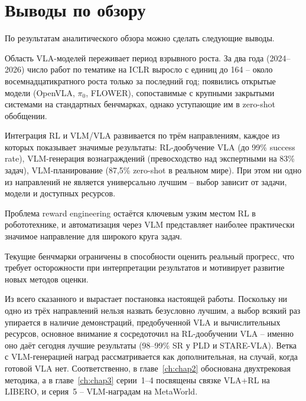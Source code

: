 \section{Выводы по обзору}
\label{sec:review-summary}

    По результатам аналитического обзора можно сделать следующие выводы.

    Область VLA-моделей переживает период взрывного роста. За два года (2024--2026) число работ по тематике на ICLR выросло с единиц до 164 -- около восемнадцатикратного роста только за последний год; появились открытые модели (OpenVLA, $\pi_0$, FLOWER), сопоставимые с крупными закрытыми системами на стандартных бенчмарках, однако уступающие им в zero-shot обобщении.

    Интеграция RL и VLM/VLA развивается по трём направлениям, каждое из которых показывает значимые результаты: RL-дообучение VLA (до 99\% success rate), VLM-генерация вознаграждений (превосходство над экспертными на 83\% задач), VLM-планирование (87,5\% zero-shot в реальном мире). При этом ни одно из направлений не является универсально лучшим -- выбор зависит от задачи, модели и доступных ресурсов.

    Проблема reward engineering остаётся ключевым узким местом RL в робототехнике, и автоматизация через VLM представляет наиболее практически значимое направление для широкого круга задач.

    Текущие бенчмарки ограничены в способности оценить реальный прогресс, что требует осторожности при интерпретации результатов и мотивирует развитие новых методов оценки.

    Из всего сказанного и вырастает постановка настоящей работы. Поскольку ни одно из трёх направлений нельзя назвать безусловно лучшим, а выбор всякий раз упирается в наличие демонстраций, предобученной VLA и вычислительных ресурсов, основное внимание я сосредоточил на RL-дообучении VLA -- именно оно даёт сегодня лучшие результаты (98--99\% SR у PLD и STARE-VLA). Ветка с VLM-генерацией наград рассматривается как дополнительная, на случай, когда готовой VLA нет. Соответственно, в главе~\ref{ch:chap2} обоснована двухтрековая методика, а в главе~\ref{ch:chap3} серии~1--4 посвящены связке VLA+RL на LIBERO, и серия~5 -- VLM-наградам на MetaWorld.

\endinput